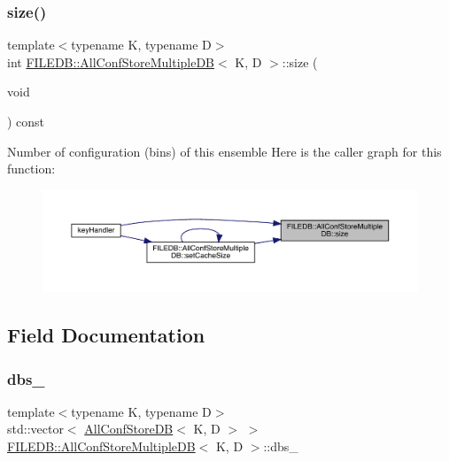 \subsubsection{\texorpdfstring{size()}{size()}\hspace{0.1cm}{\footnotesize\ttfamily [2/2]}}
{\footnotesize\ttfamily template$<$typename K, typename D$>$ \\
int \mbox{\hyperlink{classFILEDB_1_1AllConfStoreMultipleDB}{F\+I\+L\+E\+D\+B\+::\+All\+Conf\+Store\+Multiple\+DB}}$<$ K, D $>$\+::size (\begin{DoxyParamCaption}\item[{void}]{ }\end{DoxyParamCaption}) const\hspace{0.3cm}{\ttfamily [inline]}}

Number of configuration (bins) of this ensemble Here is the caller graph for this function\+:\nopagebreak
\begin{figure}[H]
\begin{center}
\leavevmode
\includegraphics[width=350pt]{d5/dbe/classFILEDB_1_1AllConfStoreMultipleDB_af05105b1ffe17093556a209ac9db1ed9_icgraph}
\end{center}
\end{figure}


\subsection{Field Documentation}
\mbox{\label{classFILEDB_1_1AllConfStoreMultipleDB_ae3a7f9bd3ad0f4bb998e8880b81305c2}} 
\subsubsection{\texorpdfstring{dbs\_}{dbs\_}}
{\footnotesize\ttfamily template$<$typename K, typename D$>$ \\
std\+::vector$<$ \mbox{\hyperlink{classFILEDB_1_1AllConfStoreDB}{All\+Conf\+Store\+DB}}$<$ K, D $>$ $>$ \mbox{\hyperlink{classFILEDB_1_1AllConfStoreMultipleDB}{F\+I\+L\+E\+D\+B\+::\+All\+Conf\+Store\+Multiple\+DB}}$<$ K, D $>$\+::dbs\+\_\+\hspace{0.3cm}{\ttfamily [protected]}}



